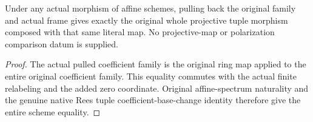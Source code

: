\begin{theorem}
\label{thm:fc-generated-line-projective-affine-naturality}
\leanok
{}
Under any actual morphism of affine schemes, pulling back the
original family and actual frame gives exactly the original whole
projective tuple morphism composed with that same literal map.
No projective-map or polarization comparison datum is supplied.
\end{theorem}
\begin{proof}
The actual pulled coefficient family is the original ring map
applied to the entire original coefficient family. This equality
commutes with the actual finite relabeling and the added zero
coordinate. Original affine-spectrum naturality and the genuine
native Rees tuple coefficient-base-change identity therefore give
the entire scheme equality.
\end{proof}
